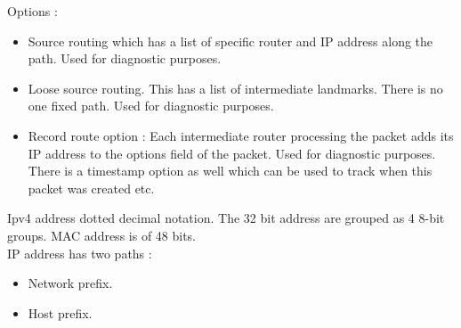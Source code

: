 \documentclass[solution,addpoints,12pt]{exam}
\begin{document}
Options :\\
\begin{itemize}
\item Source routing which has a list of specific router and IP
address along the path. Used for diagnostic purposes.
\item Loose source routing. This has a list of intermediate landmarks.
There is no one fixed path. Used for diagnostic purposes.
\item Record route option : Each intermediate router processing the packet
adds its IP address to the options field of the packet.
Used for diagnostic purposes. There is a timestamp option as well
which can be used to track when this packet was created etc.
\end{itemize}

Ipv4 address dotted decimal notation. The 32 bit address
are grouped as 4 8-bit groups. MAC address is of 48 bits.\\
IP address has two paths :\\
\begin{itemize}
\item Network prefix.
\item Host prefix.
\end{itemize}
\end{document}

